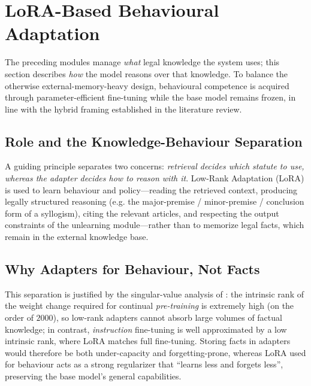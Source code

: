 \section{LoRA-Based Behavioural Adaptation}
\label{sec:lora}

The preceding modules manage \emph{what} legal knowledge the system uses; this section describes \emph{how} the model reasons over that knowledge. To balance the otherwise external-memory-heavy design, behavioural competence is acquired through parameter-efficient fine-tuning while the base model remains frozen, in line with the hybrid framing established in the literature review.

\subsection{Role and the Knowledge-Behaviour Separation}
A guiding principle separates two concerns: \emph{retrieval decides which statute to use, whereas the adapter decides how to reason with it}. Low-Rank Adaptation (LoRA) \parencite{hu2021loralowrankadaptationlarge} is used to learn behaviour and policy---reading the retrieved context, producing legally structured reasoning (e.g. the major-premise / minor-premise / conclusion form of a syllogism), citing the relevant articles, and respecting the output constraints of the unlearning module---rather than to memorize legal facts, which remain in the external knowledge base.

\subsection{Why Adapters for Behaviour, Not Facts}
This separation is justified by the singular-value analysis of \textcite{biderman2024loralearnsforgets}: the intrinsic rank of the weight change required for continual \emph{pre-training} is extremely high (on the order of $2000$), so low-rank adapters cannot absorb large volumes of factual knowledge; in contrast, \emph{instruction} fine-tuning is well approximated by a low intrinsic rank, where LoRA matches full fine-tuning. Storing facts in adapters would therefore be both under-capacity and forgetting-prone, whereas LoRA used for behaviour acts as a strong regularizer that ``learns less and forgets less'', preserving the base model's general capabilities.

